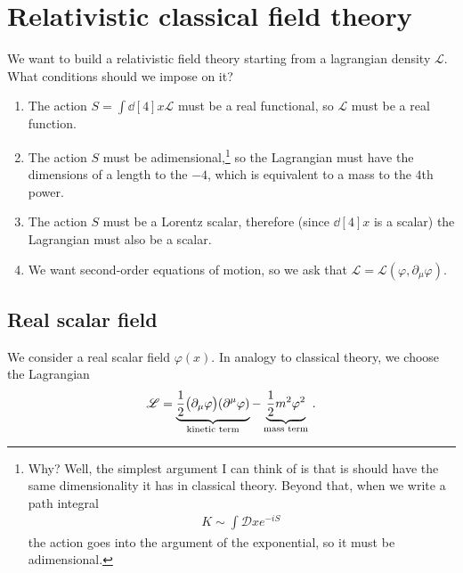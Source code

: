 \documentclass[main.tex]{subfiles}
\begin{document}
\section{Relativistic classical field theory}


We want to build a relativistic field theory starting from a lagrangian density \(\mathscr{L}\). 
What conditions should we impose on it?

\begin{enumerate}
    \item The action \(S = \int \dd[4]{x} \mathscr{L}\) must be a real functional, so \(\mathscr{L}\) must be a real function.
    \item The action \(S\) must be adimensional,\footnote{Why? Well, the simplest argument I can think of is that is should have the same dimensionality it has in classical theory. Beyond that, when we write a path integral 
    \begin{align}
    K \sim \int \mathcal{D} x e^{- i S}
    \,
    \end{align}
    the action goes into the argument of the exponential, so it must be adimensional.} so the Lagrangian must have the dimensions of a length to the \(-4\), which is equivalent to a mass to the \(4\)th power.
    \item The action \(S\) must be a Lorentz scalar, therefore (since \(\dd[4]{x}\) is a scalar) the Lagrangian must also be a scalar. 
    \item We want second-order equations of motion, so we ask that \(\mathscr{L} = \mathscr{L}( \varphi , \partial_{\mu }\varphi )\).    
\end{enumerate}

\subsection{Real scalar field}

We consider a real scalar field \(\varphi (x)\). In analogy to classical theory, we choose the Lagrangian 
%
\begin{align}
\mathscr{L} = \underbrace{\frac{1}{2} \qty(\partial_{\mu } \varphi ) \qty(\partial^{\mu } \varphi )}_{\text{kinetic term}} - \underbrace{\frac{1}{2} m^2 \varphi^2}_{\text{mass term}}
\,.
\end{align}
\end{document}
